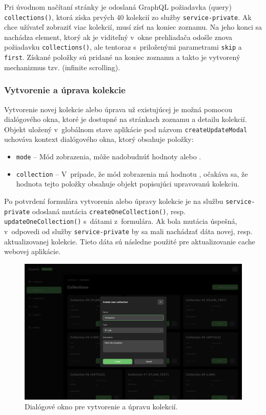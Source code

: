 \noindent Pri úvodnom načítaní stránky je odoslaná GraphQL požiadavka (query) \texttt{collections()}, ktorá získa prvých 40 kolekcií zo služby \texttt{service-private}. Ak chce užívateľ zobraziť viac kolekcií, musí zísť na koniec zoznamu. Na jeho konci sa nachádza element, ktorý ak je viditeľný v~okne prehliadača odošle znova požiadavku \texttt{collections()}, ale tentoraz s~priloženými parametrami \texttt{skip} a \texttt{first}. Získané položky sú pridané na koniec zoznamu a takto je vytvorený mechanizmus tzv.  (infinite scrolling).

\subsubsection{Vytvorenie a úprava kolekcie}
Vytvorenie novej kolekcie alebo úprava už existujúcej je možná pomocou dialógového okna, ktoré je dostupné na stránkach zoznamu a detailu kolekcií. Objekt uložený v~globálnom stave aplikácie pod názvom \texttt{createUpdateModal} uchováva kontext dialógového okna, ktorý obsahuje položky:

\begin{itemize}
	\item \texttt{mode} -- Mód zobrazenia, môže nadobudnúť hodnoty  alebo .
	\item \texttt{collection} -- V~prípade, že mód zobrazenia má hodnotu , očakáva sa, že hodnota tejto položky obsahuje objekt popisujúci upravovanú kolekciu.
\end{itemize}

\noindent Po potvrdení formulára vytvorenia alebo úpravy kolekcie je na službu \texttt{service-private} odoslaná mutácia \texttt{createOneCollection()}, resp. \texttt{updateOneCollection()} s~dátami z~formulára. Ak bola mutácia úspešná, v~odpovedi od služby \texttt{service-private} by sa mali nachádzať dáta novej, resp. aktualizovanej kolekcie. Tieto dáta sú následne použité pre aktualizovanie cache webovej aplikácie.

\begin{figure}[H]
	\centering
	\includegraphics[scale=0.085]{obrazky-figures/screenshot_collection_create}
	\caption{Dialógové okno pre vytvorenie a úpravu kolekcií.}
\end{figure}

